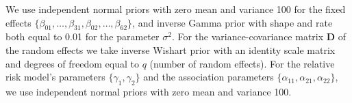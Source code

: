 We use independent normal priors with zero mean and variance 100 for the fixed effects ${\{\beta_{01},\ldots,\beta_{31}, \beta_{02},\ldots,\beta_{62}\}}$, and inverse Gamma prior with shape and rate both equal to 0.01 for the parameter $\sigma^2$. For the variance-covariance matrix $\boldsymbol{D}$ of the random effects we take inverse Wishart prior with an identity scale matrix and degrees of freedom equal to $q$ (number of random effects). For the relative risk model's parameters $\{\gamma_1, \gamma_2\}$ and the association parameters $\{\alpha_{11}, \alpha_{21}, \alpha_{22}\}$, we use independent normal priors with zero mean and variance 100.